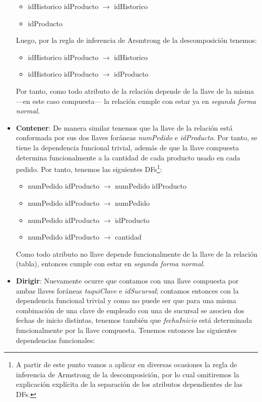\documentclass[11pt,letterpaper]{article}
\begin{document}
\begin{itemize}
\begin{itemize}
\item idHistorico idProducto $\rightarrow$ idHistorico \item idProducto
\end{itemize}

Luego, por la regla de inferencia de Arsmtrong de la descomposición tenemos:

\begin{itemize}
\item idHistorico idProducto $\rightarrow$ idHistorico\\
\item idHistorico idProducto $\rightarrow$ idProducto
\end{itemize}


Por tanto, como todo atributo de la relación depende de la llave de la misma ---en este caso compuesta--- la relación cumple con estar ya en \textit{segunda forma normal}.
\item \textbf{Contener}: De manera similar tenemos que la llave de la relación está conformada por sus dos llaves foráneas \textit{numPedido} e \textit{idProducto}. Por tanto, se tiene la dependencia funcional trivial, además de que la llave compuesta determina funcionalmente a la cantidad de cada producto usado en cada pedido. Por tanto, tenemos las siguientes DFs\footnote{A partir de este punto vamos a aplicar en diversas ocasiones la regla de inferencia de Armstrong de la descomposición, por lo cual omitiremos la explicación explícita de la separación de los atributos dependientes de las DFs.}:

\begin{itemize}
\item numPedido idProducto $\rightarrow$ numPedido idProducto

\item numPedido idProducto $\rightarrow$ numPedido
\item numPedido idProducto $\rightarrow$ idProducto
\item numPedido idProducto $\rightarrow$ cantidad
\end{itemize}

Como todo atributo no llave depende funcionalmente de la llave de la relación (tabla), entonces cumple con estar en \textit{segunda forma normal}.
\item \textbf{Dirigir}: Nuevamente ocurre que contamos con una llave compuesta por ambas llaves foráneas \textit{taquiClave} e \textit{idSucursal}; contamos entonces con la dependencia funcional trivial y como no puede ser que para una misma combinación de una clave de empleado con una de sucursal se asocien dos fechas de inicio distintas, tenemos también que \textit{fechaInicio} está determinada funcionalmente por la llave compuesta. Tenemos entonces las siguientes dependencias funcionales:


\end{itemize}
\end{document}
